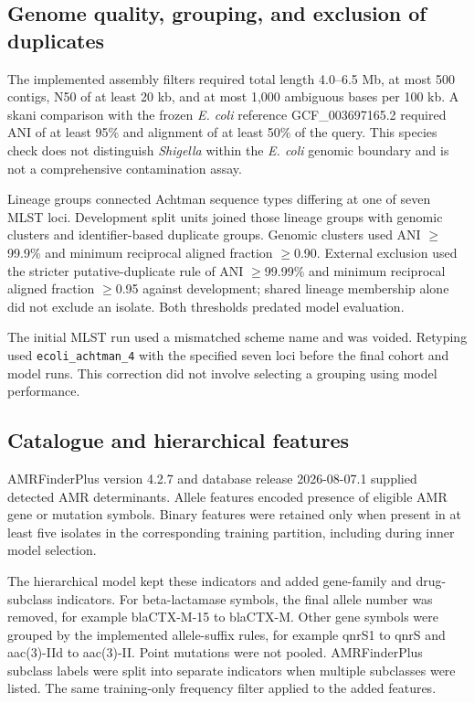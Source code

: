 \documentclass[
  american,
  11pt,
]{article}
\begin{document}
\subsection{Genome quality, grouping, and exclusion of
duplicates}\label{genome-quality-grouping-and-exclusion-of-duplicates}

The implemented assembly filters required total length 4.0--6.5 Mb, at
most 500 contigs, N50 of at least 20 kb, and at most 1,000 ambiguous
bases per 100 kb. A skani comparison with the frozen \emph{E. coli}
reference GCF\_003697165.2 required ANI of at least 95\% and alignment
of at least 50\% of the query. This species check does not distinguish
\emph{Shigella} within the \emph{E. coli} genomic boundary and is not a
comprehensive contamination assay.

Lineage groups connected Achtman sequence types differing at one of
seven MLST loci. Development split units joined those lineage groups
with genomic clusters and identifier-based duplicate groups. Genomic
clusters used ANI \ensuremath{\geq}99.9\% and minimum reciprocal aligned fraction \ensuremath{\geq}0.90.
External exclusion used the stricter putative-duplicate rule of ANI
\ensuremath{\geq}99.99\% and minimum reciprocal aligned fraction \ensuremath{\geq}0.95 against
development; shared lineage membership alone did not exclude an isolate.
Both thresholds predated model evaluation.

The initial MLST run used a mismatched scheme name and was voided.
Retyping used \texttt{ecoli\_achtman\_4} with the specified seven loci
before the final cohort and model runs. This correction did not involve
selecting a grouping using model performance.

\subsection{Catalogue and hierarchical
features}\label{catalogue-and-hierarchical-features}

AMRFinderPlus version 4.2.7 and database release 2026-08-07.1 supplied
detected AMR determinants. Allele features encoded presence of eligible
AMR gene or mutation symbols. Binary features were retained only when
present in at least five isolates in the corresponding training
partition, including during inner model selection.

The hierarchical model kept these indicators and added gene-family and
drug-subclass indicators. For beta-lactamase symbols, the final allele
number was removed, for example blaCTX-M-15 to blaCTX-M. Other gene
symbols were grouped by the implemented allele-suffix rules, for example
qnrS1 to qnrS and aac(3)-IId to aac(3)-II. Point mutations were not
pooled. AMRFinderPlus subclass labels were split into separate
indicators when multiple subclasses were listed. The same training-only
frequency filter applied to the added features.
\end{document}
